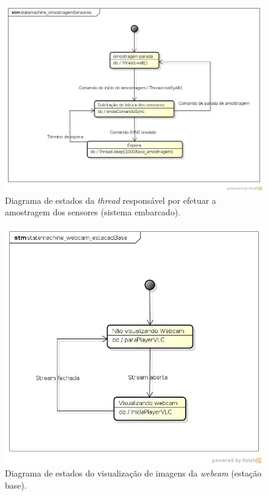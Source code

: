 \begin{figure}[H]
  \centering
  \includegraphics[width=\textwidth, keepaspectratio]{./figuras/sistEmbarcado/statemachine_AmostragemSensores_sistEmbarcado.jpg}
  \caption{Diagrama de estados da \textit{thread} responsável por efetuar a amostragem dos sensores (sistema embarcado).}
  \label{fig:diagrama_estados_amostragem_sensores_sist_embarcado}
\end{figure}

\begin{figure}[H]
  \centering
  \includegraphics[width=\textwidth, keepaspectratio]{./figuras/estacaoBase/statemachine_webcam_estacaoBase.jpg}
  \caption{Diagrama de estados do visualização de imagens da \textit{webcam} (estação base).}
  \label{fig:diagrama_estados_webcam_estacao_base}
\end{figure}

